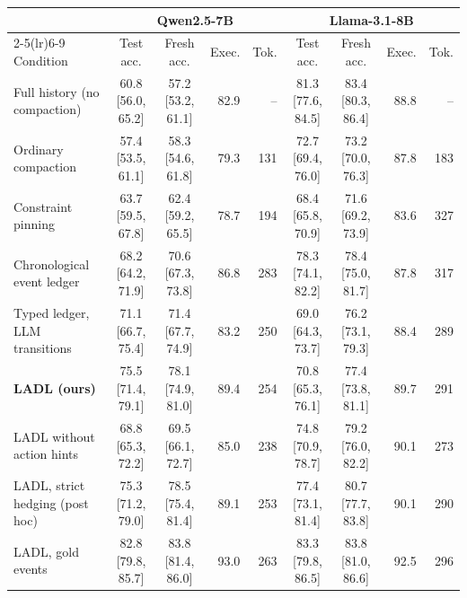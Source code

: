 \begin{tabular}{lccrrccrr}
\toprule
 & \multicolumn{4}{c}{Qwen2.5-7B} & \multicolumn{4}{c}{Llama-3.1-8B} \\
\cmidrule(lr){2-5}\cmidrule(lr){6-9}
Condition & Test acc. & Fresh acc. & Exec. & Tok. & Test acc. & Fresh acc. & Exec. & Tok. \\
\midrule
Full history (no compaction) & 60.8 [56.0, 65.2] & 57.2 [53.2, 61.1] & 82.9 & -- & 81.3 [77.6, 84.5] & 83.4 [80.3, 86.4] & 88.8 & -- \\
Ordinary compaction & 57.4 [53.5, 61.1] & 58.3 [54.6, 61.8] & 79.3 & 131 & 72.7 [69.4, 76.0] & 73.2 [70.0, 76.3] & 87.8 & 183 \\
Constraint pinning & 63.7 [59.5, 67.8] & 62.4 [59.2, 65.5] & 78.7 & 194 & 68.4 [65.8, 70.9] & 71.6 [69.2, 73.9] & 83.6 & 327 \\
Chronological event ledger & 68.2 [64.2, 71.9] & 70.6 [67.3, 73.8] & 86.8 & 283 & 78.3 [74.1, 82.2] & 78.4 [75.0, 81.7] & 87.8 & 317 \\
Typed ledger, LLM transitions & 71.1 [66.7, 75.4] & 71.4 [67.7, 74.9] & 83.2 & 250 & 69.0 [64.3, 73.7] & 76.2 [73.1, 79.3] & 88.4 & 289 \\
\textbf{LADL (ours)} & 75.5 [71.4, 79.1] & 78.1 [74.9, 81.0] & 89.4 & 254 & 70.8 [65.3, 76.1] & 77.4 [73.8, 81.1] & 89.7 & 291 \\
\midrule
LADL without action hints & 68.8 [65.3, 72.2] & 69.5 [66.1, 72.7] & 85.0 & 238 & 74.8 [70.9, 78.7] & 79.2 [76.0, 82.2] & 90.1 & 273 \\
LADL, strict hedging (post hoc) & 75.3 [71.2, 79.0] & 78.5 [75.4, 81.4] & 89.1 & 253 & 77.4 [73.1, 81.4] & 80.7 [77.7, 83.8] & 90.1 & 290 \\
LADL, gold events & 82.8 [79.8, 85.7] & 83.8 [81.4, 86.0] & 93.0 & 263 & 83.3 [79.8, 86.5] & 83.8 [81.0, 86.6] & 92.5 & 296 \\
\bottomrule
\end{tabular}
